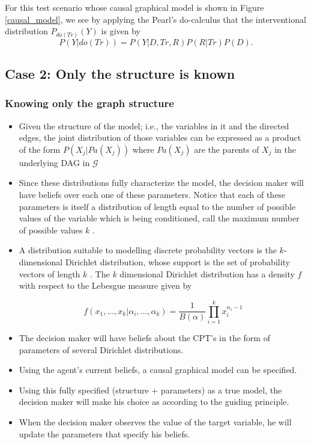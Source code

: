 \documentclass{beamer}
\theoremstyle{plain}
\begin{document}
\begin{frame}
For this test scenario whose causal graphical model is shown in Figure \ref{causal_model}, we see  by applying the Pearl's do-calculus that the interventional distribution $P_{do(Tr)}(Y)$ is given by
\[ P(Y | do(Tr))=P(Y | D, Tr, R)P(R | Tr) P(D). \]
\end{frame}

\subsection{Case 2: Only the structure is known}
\begin{frame}
\frametitle{Knowing only the graph structure}
\begin{itemize}
\item Given the structure of the model; i.e., the variables in it and the directed edges, the joint distribution of those variables can be expressed as a product of the form $P(X_j | Pa(X_j))$ where $Pa(X_j)$ are the parents of $X_j$ in the underlying DAG in $\mathcal{G}$
\item Since these distributions fully characterize the model, the decision maker will have beliefs over each one of these parameters. Notice that each of these parameters is itself a distribution of length equal to the number of possible values of the variable which is being conditioned, call the maximum number of possible values $k$ .
\end{itemize} 
\end{frame}

\begin{frame}
\begin{itemize}
\item A distribution suitable to modelling discrete probability vectors is the $k$-dimensional Dirichlet distribution, whose support is the set of probability vectors of length $k$ \cite{hjort2010bayesian}. The $k$ dimensional Dirichlet distribution has a density $f$ with respect to the Lebesgue measure given by

\[ f(x_1,...,x_k | \alpha_i,...,\alpha_k)=\frac{1}{B(\alpha)}  \prod_{i=1}^k x_i^{\alpha_i-1}\]
\item The decision maker will have beliefs about the CPT's in the form of parameters of several Dirichlet distributions.
\item Using the agent's current beliefs, a causal graphical model can be specified. 
\item Using this fully specified (structure + parameters) as a true model, the decision maker will make his choice as according to the guiding principle.
\item When the decision maker observes the value of the target variable, he will update the parameters that specify his beliefs.
\end{itemize}
\end{frame}
\end{document}
